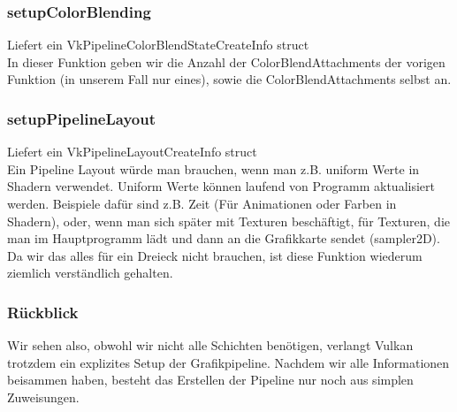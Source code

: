 \documentclass[11pt,a4paper]{report}
\begin{document}
\subsubsection{setupColorBlending}
Liefert ein VkPipelineColorBlendStateCreateInfo struct\\
In dieser Funktion geben wir die Anzahl der ColorBlendAttachments der vorigen Funktion (in unserem Fall nur eines), sowie die ColorBlendAttachments selbst an.

\subsubsection{setupPipelineLayout}
Liefert ein VkPipelineLayoutCreateInfo struct\\
Ein Pipeline Layout würde man brauchen, wenn man z.B. uniform Werte in Shadern verwendet. Uniform Werte können laufend von Programm aktualisiert werden. Beispiele dafür sind z.B. Zeit (Für Animationen oder Farben in Shadern), oder, wenn man sich später mit Texturen beschäftigt, für Texturen, die man im Hauptprogramm lädt und dann an die Grafikkarte sendet (sampler2D). Da wir das alles für ein Dreieck nicht brauchen, ist diese Funktion wiederum ziemlich verständlich gehalten.

\subsubsection{Rückblick}
Wir sehen also, obwohl wir nicht alle Schichten benötigen, verlangt Vulkan trotzdem ein explizites Setup der Grafikpipeline. Nachdem wir alle Informationen beisammen haben, besteht das Erstellen der Pipeline nur noch aus simplen Zuweisungen.
\end{document}
